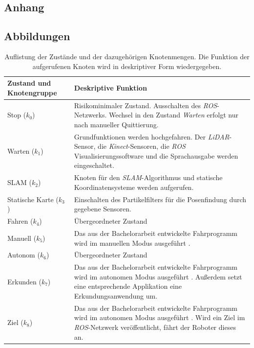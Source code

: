 \documentclass[12pt,a4paper,oneside,numbers=noenddot,headsepline,captions=tableheading,toc=bibliography,openany,tikz,margin=5mm]{scrbook}
\begin{document}
	\begin{appendix}
			\chapter{Anhang} 
			
			
			
			\section{Abbildungen} 
			\label{Abbildungen}
			
					
					
					\begin{table}[H]
						\caption{Auflistung der Zustände und der dazugehörigen Knotenmengen. Die Funktion der aufgerufenen Knoten wird in deskriptiver Form wiedergegeben.}
						\begin{center}
							
							\begin{tabular}{|m{}<{\centering}|m{}<{\centering}|}
								\hline
								
								Zustand und Knotengruppe & Deskriptive Funktion  \\ \hline \hline
								Stop ($k_0$)					&Risikominimaler Zustand. Ausschalten des \textit{ROS}-Netzwerks. Wechsel in den Zustand \textit{Warten} erfolgt nur nach manueller Quittierung. 				 \\ \cline{0-1}
								Warten ($k_1$)					&Grundfunktionen werden hochgefahren. Der \textit{LiDAR}-Sensor, die \textit{Kinect}-Sensoren, die \textit{ROS} Visualisierungssoftware und die Sprachausgabe werden eingeschaltet.				 \\ \cline{0-1}
								SLAM ($k_2$)					&Knoten für den \textit{SLAM}-Algorithmus und statische Koordinatensysteme werden aufgerufen.  				 \\ \cline{0-1}
								Statische Karte ($k_3$)			&Einschalten des Partikelfilters für die Posenfindung durch gegebene Sensoren. 				 \\ \cline{0-1} 
								Fahren ($k_4$)					&Übergeordneter Zustand				 \\ \cline{0-1}
								Manuell ($k_5$)					&Das aus der Bachelorarbeit entwickelte Fahrprogramm wird im manuellen Modus ausgeführt \cite{Bachelorarbeit}. 				 \\ \cline{0-1}
								Autonom ($k_6$)					&Übergeordneter Zustand	 				 \\ \cline{0-1}
								Erkunden ($k_7$)				&Das aus der Bachelorarbeit entwickelte Fahrprogramm wird im autonomen Modus ausgeführt \cite{Bachelorarbeit}. Außerdem setzt eine entsprechende Applikation eine Erkundungsanwendung um. 	 				 \\ \cline{0-1}
								Ziel ($k_8$)					&Das aus der Bachelorarbeit entwickelte Fahrprogramm wird im autonomen Modus ausgeführt \cite{Bachelorarbeit}. Wird ein Ziel im \textit{ROS}-Netzwerk veröffentlicht, fährt der Roboter dieses an.					 \\
								

\end{tabular}
\end{center}
\end{table}
\end{appendix}
\end{document}
